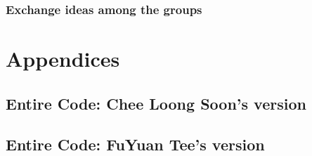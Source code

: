 \documentclass[a4paper,12pt]{article}
\begin{document}
\clearpage
\subsubsection{Exchange ideas among the groups}

\clearpage
\section{Appendices}
\subsection{Entire Code: Chee Loong Soon's version}

\clearpage
\subsection{Entire Code: FuYuan Tee's version}
\end{document}
